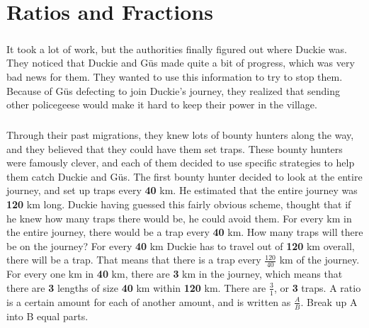 \chapter{Ratios and Fractions}
\paragraph{} It took a lot of work, but the authorities finally figured out where Duckie was. They noticed that Duckie and Güs made quite a bit of progress, which was very bad news for them. They wanted to use this information to try to stop them. Because of Güs defecting to join Duckie's journey, they realized that sending other policegeese would make it hard to keep their power in the village. 
\paragraph{} Through their past migrations, they knew lots of bounty hunters along the way, and they believed that they could have them set traps. These bounty hunters were famously clever, and each of them decided to use specific strategies to help them catch Duckie and Güs.
\vfill
\pagebreak
{The first bounty hunter decided to look at the entire journey, and set up traps every \textbf{40} km. He estimated that the entire journey was \textbf{120} km long. Duckie having guessed this fairly obvious scheme,  thought that if he knew how many traps there would be, he could avoid them. For every km in the entire journey, there would be a trap every \textbf{40} km. How many traps will there be on the journey?}
{For every \textbf{40} km Duckie has to travel out of \textbf{120} km overall, there will be a trap. That means that there is a trap every $\frac{120}{40}$ km of the journey. For every one km in \textbf{40} km, there are \textbf{3} km in the journey, which means that there are \textbf{3} lengths of size \textbf{40} km within \textbf{120} km. There are $\frac{3}{1}$, or \textbf{3} traps.}
{A ratio is a certain amount for each of another amount, and is written as $\frac{A}{B}$. Break up A into B equal parts.}
{}
